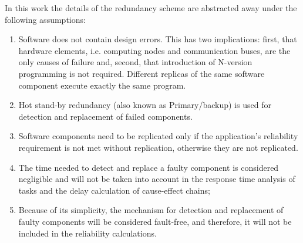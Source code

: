 In this work the details of the redundancy scheme are abstracted away under the following assumptions:
\begin{enumerate}[label=(\roman*)]
    \item Software does not contain design errors. This has two implications: first, that hardware elements, i.e. computing nodes and communication buses, are the only causes of failure and, second, that introduction of N-version programming is not required. Different replicas of the same software component execute exactly the same program.
	\item Hot stand-by redundancy (also known as Primary/backup) is used for detection and replacement of failed components.
	\item Software components need to be replicated only if the application's reliability requirement is not met without replication, otherwise they are not replicated.
	\item The time needed to detect and replace a faulty component is considered negligible and will not be taken into account in the response time analysis of tasks and the delay calculation of cause-effect chains;
	\item Because of its simplicity, the mechanism for detection and replacement of faulty components will be considered fault-free, and therefore, it will not be included in the reliability calculations.
\end{enumerate}

